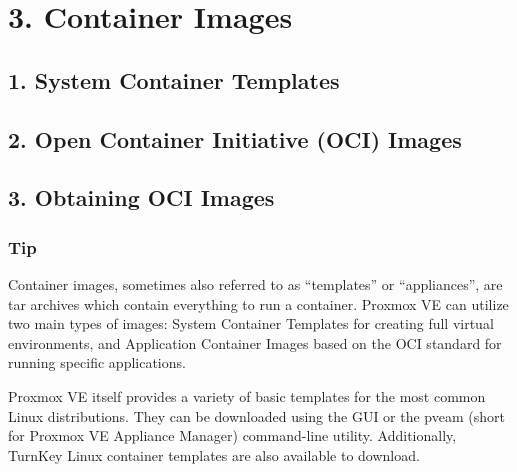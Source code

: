 \begin{table}[htbp]

\centering

\begin{tabular}

\end{tabular}

\end{table}

\begin{table}[htbp]

\centering

\begin{tabular}

\end{tabular}

\end{table}


\section{3. Container Images}

\subsection{1. System Container Templates}

\subsection{2. Open Container Initiative (OCI) Images}

\subsection{3. Obtaining OCI Images}

\subsubsection{Tip}

Container images, sometimes also referred to as “templates” or “appliances”, are tar archives which contain everything to run a container. Proxmox VE can utilize two main types of images: System Container Templates for creating full virtual environments, and Application Container Images based on the OCI standard for running specific applications.

Proxmox VE itself provides a variety of basic templates for the most common Linux distributions. They can be downloaded using the GUI or the pveam (short for Proxmox VE Appliance Manager) command-line utility. Additionally, TurnKey Linux container templates are also available to download.


